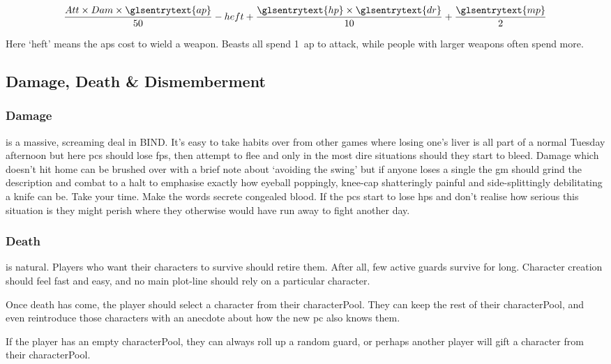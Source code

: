 \begin{multicols}{2}
\begin{align*}
\frac{Att \times Dam \times \glsentrytext{ap}}{50}
-
heft
+
\frac{\glsentrytext{hp} \times \glsentrytext{dr}}{10}
+
\frac{\glsentrytext{mp}}{2}
\end{align*}

\noindent
Here `heft' means the \glspl{ap} cost to wield a weapon.
Beasts all spend 1~\gls{ap} to attack, while people with larger weapons often spend more.

\subsection{Damage, Death \& Dismemberment}

\subsubsection{Damage}
is a massive, screaming deal in BIND.
It's easy to take habits over from other games where losing one's liver is all part of a normal Tuesday afternoon but here \glspl{pc} should lose \glspl{fp}, then attempt to flee and only in the most dire situations should they start to bleed.
Damage which doesn't hit home can be brushed over with a brief note about `avoiding the swing' but if anyone loses a single  the \gls{gm} should grind the description and combat to a halt to emphasise exactly how eyeball poppingly, knee-cap shatteringly painful and side-splittingly debilitating a knife can be.
Take your time.
Make the words secrete congealed blood.
If the \glspl{pc} start to lose \glspl{hp} and don't realise how serious this situation is they might perish where they otherwise would have run away to fight another day.

\subsubsection{Death}
\label{pcdeath}
is natural.
Players who want their characters to survive should retire them.
After all, few active \glspl{guard} survive for long.
Character creation should feel fast and easy, and no main plot-line should rely on a particular character.

Once death has come, the player should select a character from their \gls{characterPool}.
They can keep the rest of their \gls{characterPool}, and even reintroduce those characters with an anecdote about how the new \gls{pc} also knows them.

If the player has an empty \gls{characterPool}, they can always roll up a random \gls{guard}, or perhaps another player will gift a character from their \gls{characterPool}.


\end{multicols}
